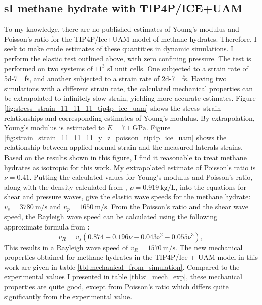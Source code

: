 \subsection{sI methane hydrate with TIP4P/ICE+UAM}
To my knowledge, there are no published estimates of Young's modulus and Poisson's ratio for the TIP4P/Ice+UAM model of methane hydrates. Therefore, I seek to make crude estimates of these quantities in dynamic simulations. I perform the elastic test outlined above, with zero confining pressure. The test is performed on two systems of $11^3$ sI unit cells. One subjected to a strain rate of \SI{5d-7}{\per\femto\second}, and another subjected to a strain rate of \SI{2d-7}{\per\femto\second}. Having two simulations with a different strain rate, the calculated mechanical properties can be extrapolated to infinitely slow strain, yielding more accurate estimates.
Figure \ref{fig:stress_strain_11_11_11_tip4p_ice_uam} shows the stress--strain relationships and corresponding estimates of Young's modulus. By extrapolation, Young's modulus is estimated to $E = \SI{7.1}{\giga\pascal}$.
Figure \ref{fig:strain_strain_11_11_11_y_z_poisson_tip4p_ice_uam} shows the relationship between applied normal strain and the measured laterals strains. Based on the results shown in this figure, I find it reasonable to treat methane hydrates as isotropic for this work. My extrapolated estimate of Poisson's ratio is $\nu = 0.41$. Putting the calculated values for Young's modulus and Poisson's ratio, along with the density calculated from \citet{Ning2010}, $\rho = \SI{0.919}{\kilo\gram\per\liter}$, into the equations for shear and pressure waves, give the elastic wave speeds for the methane hydrate: $v_s=\SI{3780}{\meter\per\second}$ and $v_p = \SI{1650}{\meter\per\second}$. From the Poisson's ratio and the shear wave speed, the Rayleigh wave speed can be calculated using the following approximate formula from \cite{0957-4484-16-6-N01}:
\begin{equation}
v_R = v_s(0.874 + 0.196\nu − 0.043\nu^{2} − 0.055\nu^{3}),
\end{equation}
This results in a Rayleigh wave speed of $v_R = \SI{1570}{\meter\per\second}$.
The new mechanical properties obtained for methane hydrates in the TIP4P/Ice + UAM model in this work are given in table \ref{tbl:mechanical_from_simulation}. Compared to the experimental values I presented in table \ref{tbl:si_mech_exp}, these mechanical properties are quite good, except from Poisson's ratio which differs quite significantly from the experimental value.
